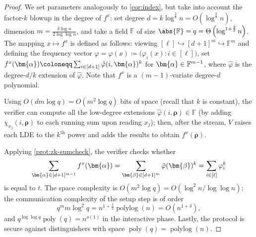 \documentclass[a4paper,UKenglish,cleveref, autoref, thm-restate]{lipics-v2021}
\theoremstyle{definition}
\newcommand{\field}{\mathbb{F}}
\newcommand{\poly}{\operatorname{poly}}
\newcommand{\polylog}{\operatorname{polylog}}
\newcommand{\dimension}{m}
\newcommand{\degree}{d}
\newcommand{\fieldsize}{q}
\newcommand{\evaluationpoint}{\bm{\fe2}}
\newcommand{\fingerprinttuple}{\bm{\rho}}
\def\fe#1{
    \ifnum#1=1
        \alpha
    \else
    \ifnum#1=2
        \beta
    \else
    \ifnum#1=3
        \gamma
    \fi\fi\fi
}
\begin{document}
\begin{proof}
    We set parameters analogously to \cref{cor:index}, but take into account the factor-$k$ blowup in the degree of $f^x$: set degree $\degree = k \log^{\frac{2}{\delta}} n = O\left(\log^{\frac{2}{\delta}} n\right)$, dimension $\dimension = \frac{\delta \log n}{2\log\log n}$, and take a field $\field$ of size $\abs{\field} = \fieldsize = \Theta\left(\log^{1 + \frac{2}{\delta}} n\right)$. The mapping $x \mapsto f^x$ is defined as follows: viewing $[\ell] \hookrightarrow [\degree + 1]^\dimension \hookrightarrow \field^\dimension$ and defining the frequency vector $\varphi = \varphi(x) \coloneqq \big(\varphi_i(x) : i \in [\ell]\big)$, set $f^x(\bm{\fe1}) \coloneqq \sum_{i \in [\degree + 1]} \hat \varphi(i, \bm{\fe1})^k$ for $\bm{\fe1} \in \field^{\dimension - 1}$, where $\hat \varphi$ is the degree-$d/k$ extension of $\hat \varphi$. Note that $f^x$ is a $(\dimension - 1)$-variate degree-$\degree$ polynomial.
    
    Using $O(\degree\dimension \log \fieldsize) = O(\dimension^2 \log \fieldsize)$ bits of space (recall that $k$ is constant), the verifier can compute all the low-degree extensions $\hat \varphi(i, \fingerprinttuple) \in \field$ (by adding $\chi_{x_j}(i, \fingerprinttuple)$ to each running sum upon reading $x_j$); then, after the stream, $V$ raises each LDE to the $k^\text{th}$ power and adds the results to obtain $f^x(\fingerprinttuple)$.
    
    Applying \cref{prot:zk-sumcheck}, the verifier checks whether
    \begin{equation*}
        \sum_{\bm{\fe1} \in [\degree + 1]^{\dimension - 1}} f^x(\bm{\fe1}) = \sum_{\evaluationpoint \in [\degree + 1]^\dimension} \hat \varphi (\evaluationpoint)^k = \sum_{i \in [\ell]} \varphi_i^k
    \end{equation*}
    is equal to $t$. The space complexity is $O(\dimension^2 \log \fieldsize) = O(\log^2 n / \log\log n)$; the communication complexity of the setup step is of order
    \begin{equation*}
        \fieldsize^\dimension \dimension \log^2 \fieldsize = n^{1 + \frac{\delta}{2}}\polylog(n) = O\left(n^{1 + \delta}\right),
    \end{equation*}
    and $\fieldsize^{\log\log \fieldsize} \poly(\fieldsize) = n^{o(1)}$ in the interactive phase. Lastly, the protocol is secure against distinguishers with space $\poly(\fieldsize) = \polylog(n)$.
\end{proof}
\end{document}

